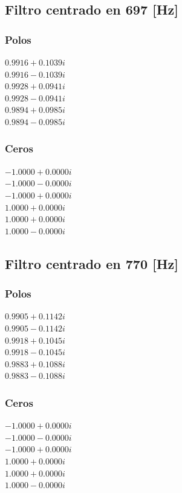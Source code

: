 \subsection*{Filtro centrado en 697 [Hz]}
\begin{multicols}{2}
  \subsubsection*{Polos}
  $0.9916 + 0.1039i$\\
  $0.9916 - 0.1039i$\\
  $0.9928 + 0.0941i$\\
  $0.9928 - 0.0941i$\\
  $0.9894 + 0.0985i$\\
  $0.9894 - 0.0985i$\\

  \columnbreak
  \subsubsection*{Ceros}
  $-1.0000 + 0.0000i$\\
  $-1.0000 - 0.0000i$\\
  $-1.0000 + 0.0000i$\\
  $1.0000 + 0.0000i$\\
  $1.0000 + 0.0000i$\\
  $1.0000 - 0.0000i$\\
\end{multicols}

\subsection*{Filtro centrado en 770 [Hz]}
\begin{multicols}{2}
  \subsubsection*{Polos}
  $0.9905 + 0.1142i$\\
  $0.9905 - 0.1142i$\\
  $0.9918 + 0.1045i$\\
  $0.9918 - 0.1045i$\\
  $0.9883 + 0.1088i$\\
  $0.9883 - 0.1088i$\\

  \columnbreak
  \subsubsection*{Ceros}
  $-1.0000 + 0.0000i$\\
  $-1.0000 - 0.0000i$\\
  $-1.0000 + 0.0000i$\\
  $1.0000 + 0.0000i$\\
  $1.0000 + 0.0000i$\\
  $1.0000 - 0.0000i$\\
\end{multicols}

